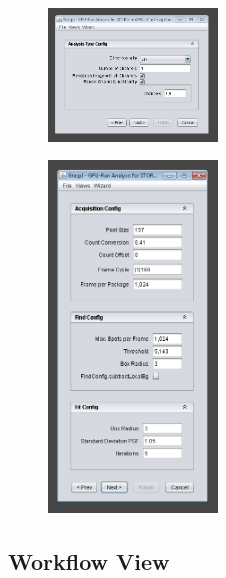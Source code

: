 \documentclass[aspectratio=169]{beamer}
\begin{document}
\begin{frame}
 
 \begin{figure}[h!]
    \centering	\includegraphics[width=0.4\textwidth]{./images/graspj_workflow3.png} 
    \caption{}
    \label{fig:workflow3}
    \end{figure} 
 
\end{frame}

\begin{frame}
 
 \begin{figure}[h!]
    \centering	\includegraphics[width=0.4\textwidth]{./images/graspj_workflow4.png} 
    \caption{}
    \label{fig:workflow4}
    \end{figure} 
 
\end{frame}


\subsection{Workflow View}
\end{document}
